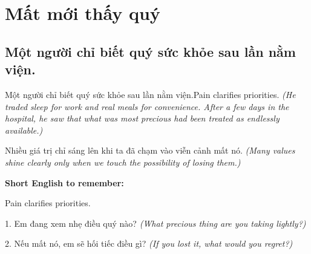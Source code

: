\chapter{Mất mới thấy quý}

\section{Một người chỉ biết quý sức khỏe sau lần nằm viện.}
\begin{truyen}{Một người chỉ biết quý sức khỏe sau lần nằm viện.}{Pain clarifies priorities.}
\textit{(He traded sleep for work and real meals for convenience. After a few days in the hospital, he saw that what was most precious had been treated as endlessly available.)}
\end{truyen}
\begin{baihoc}
Nhiều giá trị chỉ sáng lên khi ta đã chạm vào viễn cảnh mất nó.
\textit{(Many values shine clearly only when we touch the possibility of losing them.)}
\end{baihoc}
\begin{ghinhoanh}\textbf{Short English to remember:}

Pain clarifies priorities.
\end{ghinhoanh}
\begin{tuhocnhanh}
1. Em đang xem nhẹ điều quý nào? \textit{(What precious thing are you taking lightly?)}

2. Nếu mất nó, em sẽ hối tiếc điều gì? \textit{(If you lost it, what would you regret?)}
\end{tuhocnhanh}
\ngancach

